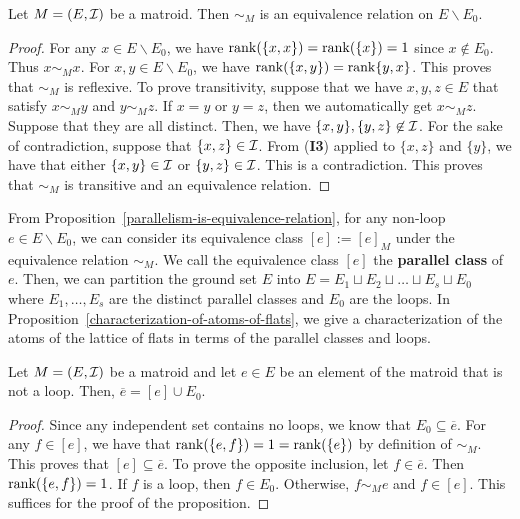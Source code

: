 \documentclass{puthesis-UG}
\begin{document}
\begin{prop} \label{parallelism-is-equivalence-relation}
	Let $M = (E, \mathcal{I})$ be a matroid. Then $\sim_M$ is an equivalence relation on $E \backslash E_0$. 
\end{prop}

\begin{proof}
	For any $x \in E \backslash E_0$, we have $\operatorname{rank} (\{x, x\}) = \operatorname{rank} (\{x\}) = 1$ since $x \notin E_0$. Thus $x \sim_M x$. For $x, y \in E \backslash E_0$, we have $\operatorname{rank} (\{x, y\}) = \operatorname{rank} \{y, x\}$. This proves that $\sim_M$ is reflexive. To prove transitivity, suppose that we have $x, y, z \in E$ that satisfy $x \sim_M y$ and $y \sim_M z$. If $x = y$ or $y = z$, then we automatically get $x \sim_M z$. Suppose that they are all distinct. Then, we have $\{x, y\}, \{y, z\} \not\in \mathcal{I}$. For the sake of contradiction, suppose that $\{x, z\} \in \mathcal{I}$. From (\textbf{I3}) applied to $\{x, z\}$ and $\{y\}$, we have that either $\{x, y\} \in \mathcal{I}$ or $\{y, z\} \in \mathcal{I}$. This is a contradiction. This proves that $\sim_M$ is transitive and an equivalence relation. 
\end{proof}

From Proposition~\ref{parallelism-is-equivalence-relation}, for any non-loop $e \in E \backslash E_0$, we can consider its equivalence class $[e] := [e]_M$ under the equivalence relation $\sim_M$. We call the equivalence class $[e]$ the \textbf{parallel class} of $e$. Then, we can partition the ground set $E$ into $E = E_1 \sqcup E_2 \sqcup \ldots \sqcup E_s \sqcup E_0$ where $E_1, \ldots, E_s$ are the distinct parallel classes and $E_0$ are the loops. In Proposition~\ref{characterization-of-atoms-of-flats}, we give a characterization of the atoms of the lattice of flats in terms of the parallel classes and loops. 

\begin{prop} \label{characterization-of-atoms-of-flats}
	Let $M = (E, \mathcal{I})$ be a matroid and let $e \in E$ be an element of the matroid that is not a loop. Then, $\overline{e} = [e] \cup E_0$.
\end{prop}

\begin{proof}
	Since any independent set contains no loops, we know that $E_0 \subseteq \overline{e}$. For any $f \in [e]$, we have that $\operatorname{rank} (\{e, f\}) = 1 = \operatorname{rank} (\{e\})$ by definition of $\sim_M$. This proves that $[e] \subseteq \overline{e}$. To prove the opposite inclusion, let $f \in \overline{e}$. Then $\operatorname{rank}(\{e, f\}) = 1$. If $f$ is a loop, then $f \in E_0$. Otherwise, $f \sim_M e$ and $f \in [e]$. This suffices for the proof of the proposition. 
\end{proof}
\end{document}

